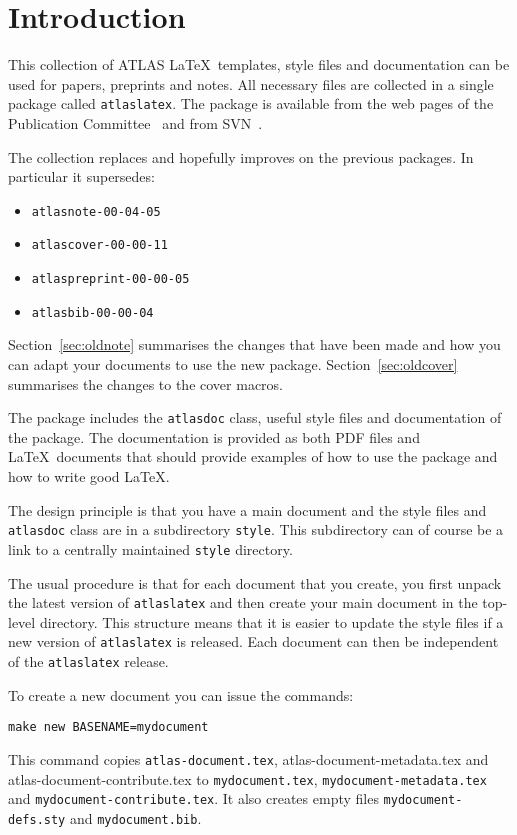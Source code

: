 \documentclass[UKenglish]{style/atlasdoc}
\author{Ian Brock}
\begin{document}
\tableofcontents
\clearpage

\section{Introduction}
\label{sec:intro}

This collection of ATLAS \LaTeX\ templates, style files and documentation
can be used for papers, preprints and notes. 
All necessary files are collected in a single package called \texttt{atlaslatex}.
The package is available from the web pages of the Publication Committee~\cite{pubcom} and from 
SVN~\cite{pubcom-svn}.

The collection replaces and hopefully improves on the previous packages. 
In particular it supersedes:
\begin{itemize}
\item \texttt{atlasnote-00-04-05}
\item \texttt{atlascover-00-00-11}
\item \texttt{atlaspreprint-00-00-05}
\item \texttt{atlasbib-00-00-04}
\end{itemize}
Section~\ref{sec:oldnote} summarises the changes that have been made and
how you can adapt your documents to use the new package.
Section~\ref{sec:oldcover} summarises the changes to the cover macros.

The package includes the \texttt{atlasdoc} class, useful style files
and documentation of the package.
The documentation is provided as both PDF files and \LaTeX\ documents
that should provide examples of how to use the package and how to write
good \LaTeX.

The design principle is that you have a main document and 
the style files and \texttt{atlasdoc} class are in a subdirectory \texttt{style}.
This subdirectory can of course be a link to a centrally maintained \texttt{style} directory.

The usual procedure is that for each document that you create,
you first unpack the latest version of \texttt{atlaslatex} and
then create your main document in the top-level directory.
This structure means that it is easier to update the style files if a new version of
\texttt{atlaslatex} is released. 
Each document can then be independent of the \texttt{atlaslatex} release.

To create a new document you can issue the commands:
%
\begin{verbatim}
make new BASENAME=mydocument
\end{verbatim}
%
This command copies \texttt{atlas-document.tex}, 
{atlas-document-metadata.tex} and {atlas-document-contribute.tex}
to \texttt{mydocument.tex},  \texttt{mydocument-metadata.tex} and
\texttt{mydocument-contribute.tex}.
It also creates empty files \texttt{mydocument-defs.sty} and \texttt{mydocument.bib}.
\end{document}

